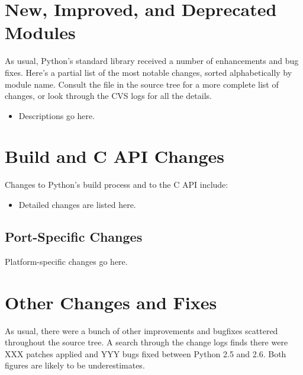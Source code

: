 \documentclass{howto}
\begin{document}
\section{New, Improved, and Deprecated Modules}

As usual, Python's standard library received a number of enhancements and
bug fixes.  Here's a partial list of the most notable changes, sorted
alphabetically by module name. Consult the
 file in the source tree for a more
complete list of changes, or look through the CVS logs for all the
details.

\begin{itemize}

\item Descriptions go here.

\end{itemize}




\section{Build and C API Changes}

Changes to Python's build process and to the C API include:

\begin{itemize}

\item Detailed changes are listed here.

\end{itemize}


\subsection{Port-Specific Changes}

Platform-specific changes go here.


\section{Other Changes and Fixes \label{section-other}}

As usual, there were a bunch of other improvements and bugfixes
scattered throughout the source tree.  A search through the change
logs finds there were XXX patches applied and YYY bugs fixed between
Python 2.5 and 2.6.  Both figures are likely to be underestimates.
\end{document}
